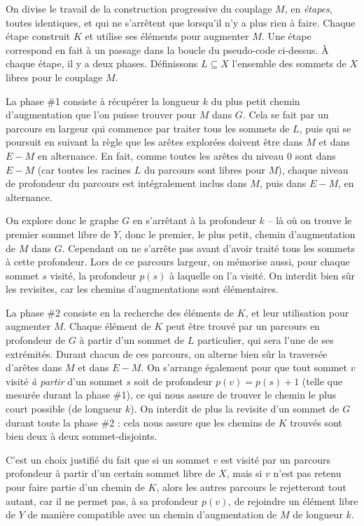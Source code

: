  On divise le travail de la construction progressive du couplage $M$, en \emph{étapes}, toutes identiques, et qui ne s'arrêtent que lorsqu'il n'y a plus rien à faire. Chaque étape construit $K$ et utilise ses éléments pour augmenter $M$. Une étape correspond en fait à un passage dans la boucle  du pseudo-code ci-dessus. À chaque étape, il y a deux phases. Définissons $L \subseteq X$ l'ensemble des sommets de $X$ libres pour le couplage $M$.
 
 La phase \#1 consiste à récupérer la longueur $k$ du plus petit chemin d'augmentation que l'on puisse trouver pour $M$ dans $G$. Cela se fait par un parcours en largeur qui commence par traiter tous les sommets de $L$, puis qui se poursuit en suivant la règle que les arêtes explorées doivent être dans $M$ et dans $E \minus M$ en alternance. En fait, comme toutes les arêtes du niveau $0$ sont dans $E\minus M$ (car toutes les racines $L$ du parcours sont libres pour $M$), chaque niveau de profondeur du parcours est intégralement inclus dans $M$, puis dans $E \minus M$, en alternance.
 
 On explore donc le graphe $G$ en s'arrêtant à la profondeur $k$ -- là où on trouve le premier sommet libre de $Y$, donc le premier, le plus petit, chemin d'augmentation de $M$ dans $G$. Cependant on ne s'arrête pas avant d'avoir traité tous les sommets à cette profondeur. Lors de ce parcours largeur, on mémorise aussi, pour chaque sommet $s$ visité, la profondeur $p(s)$ à laquelle on l'a visité. On interdit bien sûr les revisites, car les chemins d'augmentations sont élémentaires.

 La phase \#2 consiste en la recherche des éléments de $K$, et leur utilisation pour augmenter $M$. Chaque élément de $K$ peut être trouvé par un parcours en profondeur de $G$ à partir d'un sommet de $L$ particulier, qui sera l'une de ses extrémités. Durant chacun de ces parcours, on alterne bien sûr la traversée d'arêtes dans $M$ et dans $E\minus M$. On s'arrange également pour que tout sommet $v$ visité \emph{à partir} d'un sommet $s$ soit de profondeur $p(v) = p(s) + 1$ (telle que mesurée durant la phase \#1), ce qui nous assure de trouver le chemin le plus court possible (de longueur $k$). On interdit de plus la revisite d'un sommet de $G$ durant toute la phase \#2 : cela nous assure que les chemins de $K$ trouvés sont bien deux à deux sommet-disjoints.
 
 C'est un choix justifié du fait que si un sommet $v$ est visité par un parcours profondeur à partir d'un certain sommet libre de $X$, mais si $v$ n'est pas retenu pour faire partie d'un chemin de $K$, alors les autres parcours le rejetteront tout autant, car il ne permet pas, à sa profondeur $p(v)$, de rejoindre un élément libre de $Y$ de manière compatible avec un chemin d'augmentation de $M$ de longueur $k$.
 
